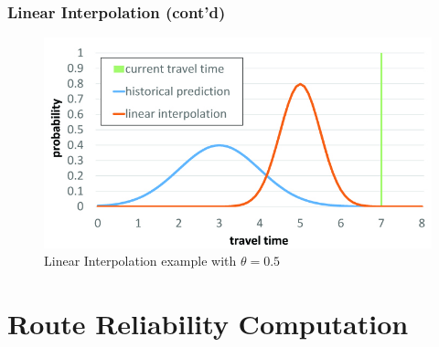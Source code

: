 \documentclass[t]{beamer}
\begin{document}
%

\begin{frame}\frametitle{Linear Interpolation \small{(cont'd)}}

\begin{figure}
    \centering
    \includegraphics[width=0.80\columnwidth]{tt_interpolation.jpg}\\
    Linear Interpolation example with $\theta = 0.5$
\end{figure}
\end{frame}

\section{Route Reliability Computation}
\end{document}
